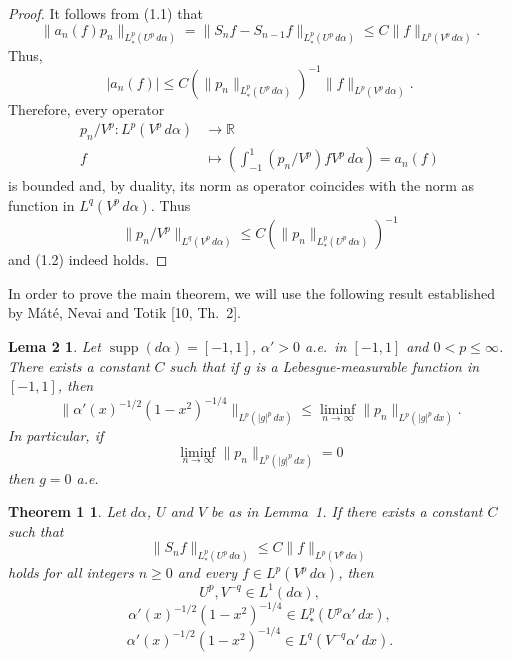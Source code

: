 \documentclass[10pt,a4paper]{article}
\newcommand{\R}{\mathbb{R}}
\newcommand{\supp}{\operatorname{supp}}
\newcommand{\longto}{\longrightarrow}
\theoremstyle{plain}
\newtheorem*{lemmaTwo}{Lema 2}
\newtheorem*{theoOne}{Theorem 1}
\theoremstyle{remark}
\begin{document}
\begin{proof}
It follows from (1.1) that
$$
\|a_{n}(f)p_{n}\|_{L^{p}_{*}(U^{p}\,d\alpha)}
= \|S_{n}f-S_{n-1}f\|_{L^{p}_{*}(U^{p}\,d\alpha)}
\leq C\|f\|_{L^{p}(V^{p}\,d\alpha)}.
$$
Thus,
$$
|a_{n}(f)| \leq C \left( \|p_{n}\|_{L^{p}_{*}(U^{p}\,d\alpha)} \right)^{-1}
\|f\|_{L^{p}(V^{p}\,d\alpha)}.
$$
Therefore, every operator
\begin{align*}
p_{n}/V^{p} : L^{p}(V^{p}\,d\alpha) &\longto \R \\
f &\longmapsto \left(\int_{-1}^{1} (p_{n}/V^{p})fV^{p}\,d\alpha \right)
= a_{n}(f)
\end{align*}
is bounded and, by duality, its norm as operator coincides with
the norm as function in $L^{q}(V^{p}\,d\alpha)$. Thus
$$
\|p_{n}/V^{p}\|_{L^{q}(V^{p}\,d\alpha)}
\leq C \left(\|p_{n}\|_{L^{p}_{*}(U^{p}\,d\alpha)} \right)^{-1}
$$
and (1.2) indeed holds.
\end{proof}



In order to prove the main theorem, we will use the following
result established by M\'{a}t\'{e}, Nevai and Totik [10, Th.~2].

\begin{lemmaTwo}
Let $\supp(d\alpha) = [-1,1]$, $\alpha' > 0$
a.e.\ in $[-1,1]$ and $0 < p \leq \infty$. There exists
a constant $C$ such that if $g$ is a Lebesgue-measurable function
in $[-1,1]$, then
$$
\|\alpha'(x)^{-1/2} (1-x^{2})^{-1/4} \|_{L^{p}(|g|^{p}\,dx)}
\leq \liminf_{n \to \infty} \|p_{n}\|_{L^{p}(|g|^{p}\,dx)}.
$$
In particular, if
$$
\liminf_{n \to \infty}\|p_{n}\|_{L^{p}(|g|^{p}\,dx)} = 0
$$
then $g = 0$ a.e.
\end{lemmaTwo}

\begin{theoOne}
Let $d\alpha$, $U$ and $V$ be as in Lemma~1. If
there exists a constant $C$ such that
$$
\|S_{n}f\|_{L^{p}_{*}(U^{p}\,d\alpha)}
\leq C\|f\|_{L^{p}(V^{p}\,d\alpha)}
$$
holds for all integers $n \geq 0$ and every $f \in L^{p}(V^{p}\,d\alpha)$,
then
\begin{equation}
U^{p}, V^{-q} \in L^{1}(d\alpha),
\tag{1.3}
\end{equation}
\begin{equation}
\alpha'(x)^{-1/2} (1-x^{2})^{-1/4} \in L^{p}_{*}(U^{p}\alpha'\,dx),
\tag{1.4}
\end{equation}
\begin{equation}
\alpha'(x)^{-1/2} (1-x^{2})^{-1/4} \in L^{q}(V^{-q}\alpha'\,dx).
\tag{1.5}
\end{equation}
\end{theoOne}
\end{document}
